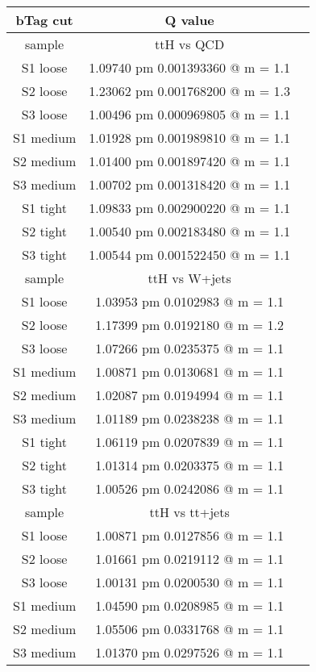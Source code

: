 \documentclass[12pt,a4paper,twoside,english]{report}
\begin{document}
\begin{table}[h!]
  \center
  \begin{tabular}{||c|c|c||}
    \hline
    \hline
    bTag cut & Q value \\
    \hline
    sample & ttH vs QCD\\
    \hline
    S1 loose  & 1.09740 pm 0.001393360 @ m = 1.1\\
    S2 loose  & 1.23062 pm 0.001768200 @ m = 1.3\\
    S3 loose  & 1.00496 pm 0.000969805 @ m = 1.1\\
    S1 medium & 1.01928 pm 0.001989810 @ m = 1.1\\
    S2 medium & 1.01400 pm 0.001897420 @ m = 1.1\\
    S3 medium & 1.00702 pm 0.001318420 @ m = 1.1\\
    S1 tight  & 1.09833 pm 0.002900220 @ m = 1.1\\
    S2 tight  & 1.00540 pm 0.002183480 @ m = 1.1\\
    S3 tight  & 1.00544 pm 0.001522450 @ m = 1.1\\
    \hline
    \hline
    sample & ttH vs W+jets\\
    \hline
    S1 loose  & 1.03953 pm 0.0102983 @ m = 1.1\\
    S2 loose  & 1.17399 pm 0.0192180 @ m = 1.2\\ 
    S3 loose  & 1.07266 pm 0.0235375 @ m = 1.1\\
    S1 medium & 1.00871 pm 0.0130681 @ m = 1.1\\
    S2 medium & 1.02087 pm 0.0194994 @ m = 1.1\\
    S3 medium & 1.01189 pm 0.0238238 @ m = 1.1\\
    S1 tight  & 1.06119 pm 0.0207839 @ m = 1.1\\
    S2 tight  & 1.01314 pm 0.0203375 @ m = 1.1\\
    S3 tight  & 1.00526 pm 0.0242086 @ m = 1.1\\
    \hline
    \hline
    sample & ttH vs tt+jets\\
    \hline
    S1 loose  & 1.00871 pm 0.0127856 @ m = 1.1\\
    S2 loose  & 1.01661 pm 0.0219112 @ m = 1.1\\ 
    S3 loose  & 1.00131 pm 0.0200530 @ m = 1.1\\
    S1 medium & 1.04590 pm 0.0208985 @ m = 1.1\\
    S2 medium & 1.05506 pm 0.0331768 @ m = 1.1\\
    S3 medium & 1.01370 pm 0.0297526 @ m = 1.1\\

\end{tabular}
\end{table}
\end{document}

